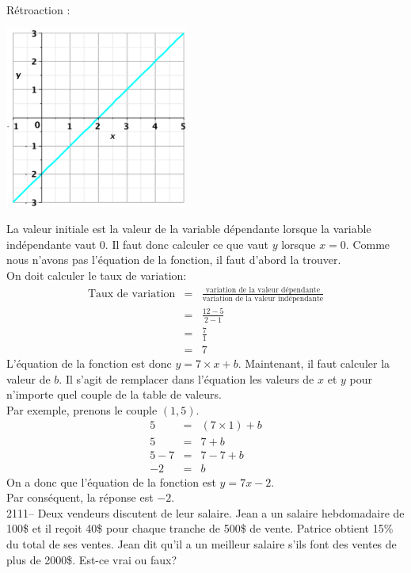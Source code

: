 \documentclass[letterpaper, 12pt]{article}
\begin{document}
R\'etroaction :\\
\begin{center}
 \includegraphics[width=6cm,bb=20 118 575 673]{Q2110.eps}
\end{center}
La valeur initiale est la valeur de la variable d\'ependante lorsque la variable ind\'ependante vaut 0. Il faut donc calculer ce que vaut $y$ lorsque $x=0$. Comme nous n'avons pas l'\'equation de la fonction, il faut d'abord la trouver.\\
On doit calculer le taux de variation:
\begin{eqnarray*}
\textrm{Taux de variation} &=& \frac{\textrm{variation de la valeur d\'ependante}}{\textrm{variation de la valeur ind\'ependante}}\\
 &=& \frac{12-5}{2-1} \\
 &=& \frac{7}{1} \\
 &=& 7
\end{eqnarray*}
L'\'equation de la fonction est donc $y = 7 \times x + b $. Maintenant, il faut calculer la valeur de $b$. Il s'agit de remplacer dans l'\'equation les valeurs de $x$ et $y$ pour n'importe quel couple de la table de valeurs. \\
Par exemple, prenons le couple $(1, 5)$.
\begin{eqnarray*}
 5 &=& (7 \times 1) + b \\
 5 &=& 7 + b \\
 5 -7 &=& 7 -7 + b \\
-2 &=& b
\end{eqnarray*}
On a donc que l'\'equation de la fonction est $y = 7x - 2$. \\
Par cons\'equent, la r\'eponse est $-2$.\\

2111-- Deux vendeurs discutent de leur salaire. Jean a un salaire hebdomadaire de 100\$ et il re\c coit 40\$ pour chaque tranche de 500\$ de vente. Patrice obtient 15\% du total de ses ventes. Jean dit qu'il a un meilleur salaire s'ils font des ventes de plus de 2000\$. Est-ce vrai ou faux?\\
\end{document}
